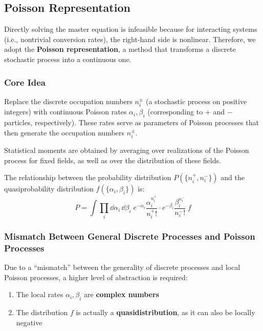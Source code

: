 \subsection{Poisson Representation}\label{subsec:poisson-rep}

Directly solving the master equation is infeasible because for interacting systems (i.e., nontrivial conversion rates), the right-hand side is nonlinear. Therefore, we adopt the \textbf{Poisson representation}\cite{gardiner1977}, a method that transforms a discrete stochastic process into a continuous one.

\subsubsection{Core Idea}

\begin{notebox}
Replace the discrete occupation numbers $n_i^\pm$ (a stochastic process on positive integers) with continuous Poisson rates $\alpha_i, \beta_i$ (corresponding to $+$ and $-$ particles, respectively). These rates serve as parameters of Poisson processes that then generate the occupation numbers $n_i^\pm$.

Statistical moments are obtained by averaging over realizations of the Poisson process for fixed fields, as well as over the distribution of these fields.
\end{notebox}

The relationship between the probability distribution $P(\{n_i^+, n_i^-\})$ and the quasiprobability distribution $f(\{\alpha_i, \beta_i\})$ is:
\begin{equation}\label{eq:poisson-rep}
\boxed{P = \int \prod_i \dd\alpha_i \, \dd\beta_i \; e^{-\alpha_i}\frac{\alpha_i^{n_i^+}}{n_i^+!} \cdot e^{-\beta_i}\frac{\beta_i^{n_i^-}}{n_i^-!} \; f}
\end{equation}

\subsubsection{Mismatch Between General Discrete Processes and Poisson Processes}

Due to a ``mismatch'' between the generality of discrete processes and local Poisson processes, a higher level of abstraction is required:
\begin{enumerate}
    \item The local rates $\alpha_i, \beta_i$ are \textbf{complex numbers}
    \item The distribution $f$ is actually a \textbf{quasidistribution}, as it can also be locally negative
\end{enumerate}

